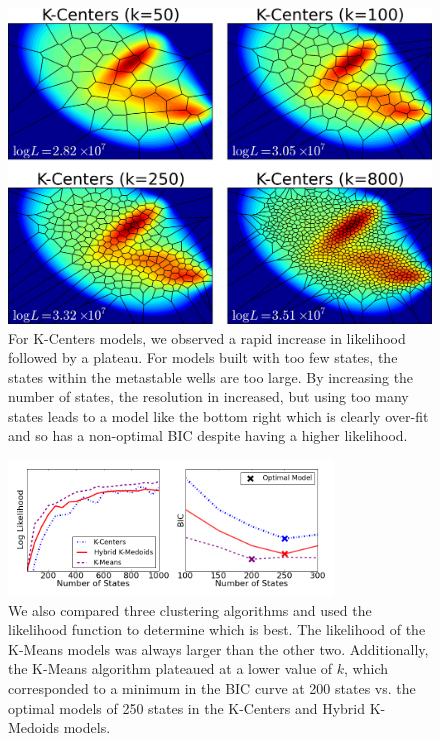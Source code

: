 \documentclass[twocolumn,floatfix,nofootinbib,aps]{revtex4-1}
\begin{document}
\begin{figure}
\includegraphics[width=5in]{figs/kcent_vors.png}
\caption{For K-Centers models, we observed a rapid increase in likelihood followed by a plateau. For models built with too few states, the states within the metastable wells are too large. By increasing the number of states, the resolution in increased, but using too many states leads to a model like the bottom right which is clearly over-fit and so has a non-optimal BIC despite having a higher likelihood.}
\end{figure}

\begin{figure}
\centering
\includegraphics[width=3.4in]{figs/cluster_comp.png}
\caption{We also compared three clustering algorithms and used the likelihood function to determine which is best. The likelihood of the K-Means models was always larger than the other two. Additionally, the K-Means algorithm plateaued at a lower value of $k$, which corresponded to a minimum in the BIC curve at 200 states vs. the optimal models of 250 states in the K-Centers and Hybrid K-Medoids models.} \end{figure}
\end{document}
